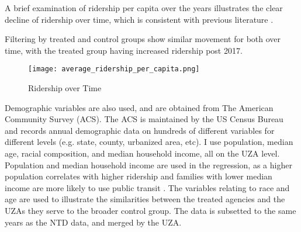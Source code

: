 \documentclass [12pt]{report}
\begin{document}
A brief examination of ridership per capita over the years illustrates the clear decline of ridership over time, which is consistent with previous literature \parencite{erhardt22}.
\begin{table}[H] \centering \renewcommand*{\arraystretch}{1.1}\caption{Ridership per capita by year}
\end{table}
Filtering by treated and control groups show similar movement for both over time, with the treated group having increased ridership post 2017.
\begin{figure}[H]
    \centering
    \texttt{[image: average\_ridership\_per\_capita.png]} %
    \caption{Ridership over Time}
\end{figure}
\indent Demographic variables are also used, and are obtained from The American Community Survey (ACS). The ACS is maintained by the US Census Bureau and records annual demographic data on hundreds of different variables for different levels (e.g. state, county, urbanized area, etc). I use population, median age, racial composition, and median household income, all on the UZA level. Population and median household income are used in the regression, as a higher population correlates with higher ridership and families with lower median income are more likely to use public transit \parencite{wang}. The variables relating to race and age are used to illustrate the similarities between the treated agencies and the UZAs they serve to the broader control group. The data is subsetted to the same years as the NTD data, and merged by the UZA.
\end{document}
